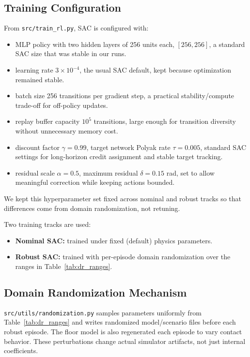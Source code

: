 \documentclass[10pt,twocolumn,letterpaper]{article}
\begin{document}
\subsection{Training Configuration}
From \texttt{src/train\_rl.py}, SAC is configured with:
\begin{itemize}[leftmargin=*,noitemsep]
    \item MLP policy with two hidden layers of 256 units each, $[256,256]$, a standard SAC size that was stable in our runs.
    \item learning rate $3\times10^{-4}$, the usual SAC default, kept because optimization remained stable.
    \item batch size 256 transitions per gradient step, a practical stability/compute trade-off for off-policy updates.
    \item replay buffer capacity $10^5$ transitions, large enough for transition diversity without unnecessary memory cost.
    \item discount factor $\gamma=0.99$, target network Polyak rate $\tau=0.005$, standard SAC settings for long-horizon credit assignment and stable target tracking.
    \item residual scale $\alpha = 0.5$, maximum residual $\delta = 0.15$ rad, set to allow meaningful correction while keeping actions bounded.
\end{itemize}
We kept this hyperparameter set fixed across nominal and robust tracks so that differences come from domain randomization, not retuning.

Two training tracks are used:
\begin{itemize}[leftmargin=*,noitemsep]
    \item \textbf{Nominal SAC:} trained under fixed (default) physics parameters.
    \item \textbf{Robust SAC:} trained with per-episode domain randomization over the ranges in Table~\ref{tab:dr_ranges}.
\end{itemize}

\subsection{Domain Randomization Mechanism}
\texttt{src/utils/randomization.py} samples parameters uniformly from Table~\ref{tab:dr_ranges} and writes randomized model/scenario files before each robust episode. The floor model is also regenerated each episode to vary contact behavior. These perturbations change actual simulator artifacts, not just internal coefficients.
\end{document}
